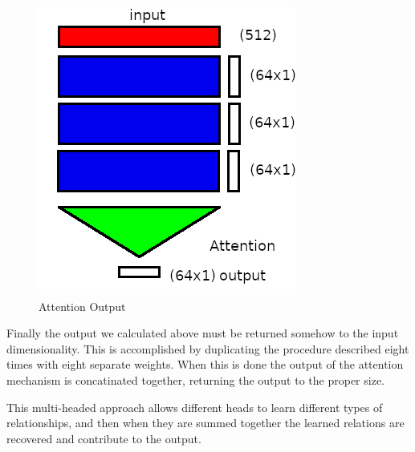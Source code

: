 \begin{figure}[H]
	\begin{center}
		
		
		\includegraphics[scale=0.5]{diagram-mat03-64}
	\end{center}
	\caption[Attention Output]{Attention Output}
	
\end{figure}




Finally the output we calculated above must be returned somehow to the input dimensionality. This is accomplished by duplicating the procedure described eight times with eight separate weights. When this is done the output of the attention mechanism is concatinated together, returning the output to the proper size.

This multi-headed approach allows different heads to learn different types of relationships, and then when they are summed together the learned relations are recovered and contribute to the output.

